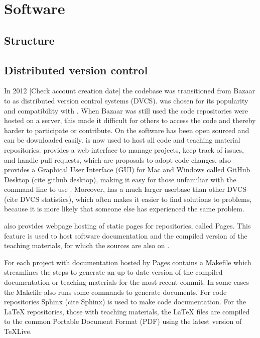 \chapter{Software}
\label{ch:software}

\section{Structure}


\section{Distributed version control}

In 2012 [Check account creation date] the \hisparc codebase was transitioned from Bazaar \cite{bazaar} to \git \cite{git} as distributed version control systems (DVCS). \git was chosen for its popularity and compatibility with \github \cite{github}. When Bazaar was still used the code repositories were hosted on a \nikhef server, this made it difficult for others to access the code and thereby harder to participate or contribute. On \github the software has been open sourced and can be downloaded easily. \github is now used to host all \hisparc code and teaching material repositories. \github provides a web-interface to manage projects, keep track of issues, and handle pull requests, which are proposals to adopt code changes. \github also provides a Graphical User Interface (GUI) for Mac and Windows called GitHub Desktop (cite github desktop), making it easy for those unfamiliar with the command line to use \git. Moreover, \git has a much larger userbase than other DVCS (cite DVCS statistics), which often makes it easier to find solutions to problems, because it is more likely that someone else has experienced the same problem.

\github also provides webpage hosting of static pages for repositories, called \github Pages. This feature is used to host software documentation and the compiled version of the teaching materials, for which the sources are also on \github.

For each project with documentation hosted by \github Pages contains a Makefile which streamlines the steps to generate an up to date version of the compiled documentation or teaching materials for the most recent commit. In some cases the Makefile also runs some commands to generate documents. For code repositories Sphinx (cite Sphinx) is used to make code documentation. For the LaTeX repositories, those with teaching materials, the LaTeX files are compiled to the common Portable Document Format (PDF) using the latest version of TeXLive.


